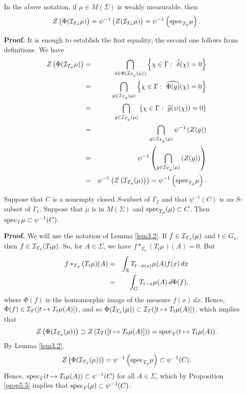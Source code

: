 \documentclass[12pt,leqno]{article}
\def\R{\Bbb R}
\def\cI{{\cal I}}
\def\spec{{\rm spec}}
\begin{document}
\begin{lemma}
In the above notation, if 
 $\mu\in M(\Sigma)$ is weakly measurable,
then
$$Z\left( \Phi({\cal I}_{T_\phi}\mu)\right)=
\psi^{-1}\left(    
Z ({\cal I}_{T_\phi}\mu)\right)=
\psi^{-1}\left(    
\spec_{T_\phi}\mu\right).
$$
\label{lem3.2}
\end{lemma}

{\bf Proof.}  It is enough to establish the first equality; the second one follows from definitions.
We have
\begin{eqnarray*}
Z\left( \Phi({\cal I}_{T_\phi}\mu)\right)
&=&
\bigcap_{\delta\in    \Phi({\cal I}_{T_\phi}(\mu))   }
\left\{
\chi\in \Gamma:\ \widehat{\delta}(\chi)=0\right\}\\
&=&
\bigcap_{g \in    {\cal I}_{T_\phi}(\mu)   }
\left\{
\chi\in \Gamma:\ \widehat{\Phi(g)}(\chi)=0\right\}\\
&=&
\bigcap_{g \in    {\cal I}_{T_\phi}(\mu)   }
\left\{
\chi\in \Gamma:\ 
\widehat{g }(\psi(\chi))=0\right\}\\
&=&
\bigcap_{g \in    {\cal I}_{T_\phi}(\mu)   }
\psi^{-1}\left(  Z(g)  \right)\\
&=&
\psi^{-1}\left(
\bigcap_{g \in    {\cal I}_{T_\phi}(\mu)   }
\left(  Z(g)  \right)\right)\\
&=&
\psi^{-1}\left(
Z \left(   {\cal I}_{T_\phi}(\mu)   
  \right)\right)
=\psi^{-1}\left(\spec_{T_\phi}\mu\right).
\end{eqnarray*}


\begin{lemma}
Suppose that $C$ is a nonempty closed $S$-subset of
$\Gamma_2$ and that $\psi^{-1}(C)$ is an 
$S$-subset of $\Gamma_1$.  Suppose that $\mu$ is in $M(\Sigma)$ and 
$\spec_{T_\phi}(\mu)\subset C$.  
Then $\spec_T\mu\subset \psi^{-1}(C)$.
\label{lem3.3}
\end{lemma}


{\bf Proof.}\quad 
We will use the notation of Lemma \ref{lem3.2}.
If $f\in \cI_{T_\phi}(\mu)$ and $t\in G_1$, 
then $f\in \cI_{T_\phi}(T_t \mu)$.  So,
 for $A\in\Sigma$, we have
$f*_{T_\phi}(T_t\mu)(A)=0$.  
But
\begin{eqnarray*}
f*_{T_\phi}(T_t\mu)(A)&=&
\int_\R T_{t-\phi(x)}\mu(A)f(x)\, dx\\
&=&
\int_G T_{t- x }\mu(A)\, d\Phi(f),
\end{eqnarray*}
where $\Phi(f)$ is the homomorphic image
of the measure $f(x)\,dx$.
Hence,
$\Phi(f) \in \cI_T ([t\mapsto T_t\mu(A)])$,
and so $\Phi(\cI_{T_\phi}(\mu))\subset 
\cI_T([t\mapsto T_t\mu(A)])$, which implies that
  $$Z\left(\Phi(\cI_{T_\phi}(\mu))\right)\supset 
Z\left(\cI_T([t\mapsto T_t\mu(A)])\right)
=\spec_T(t\mapsto T_t\mu(A)).$$
By Lemma \ref{lem3.2}, 
$$Z\left(\Phi(\cI_{T_\phi}(\mu))\right)=
\psi^{-1}\left(
\spec_{T_\phi}\mu
\right)\subset \psi^{-1}(C).$$
Hence, $\spec_T(t\mapsto T_t\mu(A))\subset \psi^{-1}(C)$
for all $A\in\Sigma$, which by Proposition \ref{prop5.5}  implies that
$\spec_T(\mu)\subset  \psi^{-1}(C)$.
\end{document}

